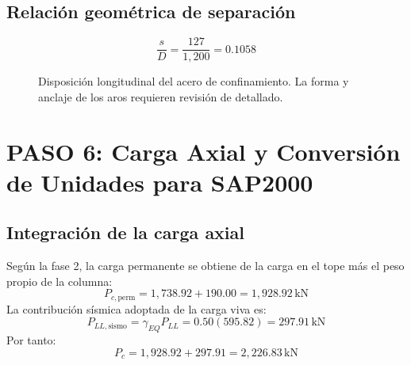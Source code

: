 \documentclass[11pt,a4paper]{article}
\begin{document}
\subsection{Relación geométrica de separación}
\begin{equation*}
\frac{s}{D}=\frac{127}{1{,}200}=\boxed{0.1058}
\end{equation*}


\begin{figure}[H]
\centering
{}
\caption{Disposición longitudinal del acero de confinamiento. La forma y anclaje de los aros requieren revisión de detallado.}
\end{figure}

\section{PASO 6: Carga Axial y Conversión de Unidades para SAP2000}

\subsection{Integración de la carga axial}
Según la fase 2, la carga permanente se obtiene de la carga en el tope
más el peso propio de la columna:
\begin{equation*}
P_{c,\mathrm{perm}}=1{,}738.92+190.00
=1{,}928.92\,\mathrm{kN}
\end{equation*}
La contribución sísmica adoptada de la carga viva es:
\begin{equation*}
P_{LL,\mathrm{sismo}}=\gamma_{EQ}P_{LL}
=0.50(595.82)=\boxed{297.91\,\mathrm{kN}}
\end{equation*}
Por tanto:
\begin{equation*}
P_c=1{,}928.92+297.91=\boxed{2{,}226.83\,\mathrm{kN}}
\end{equation*}
\end{document}
